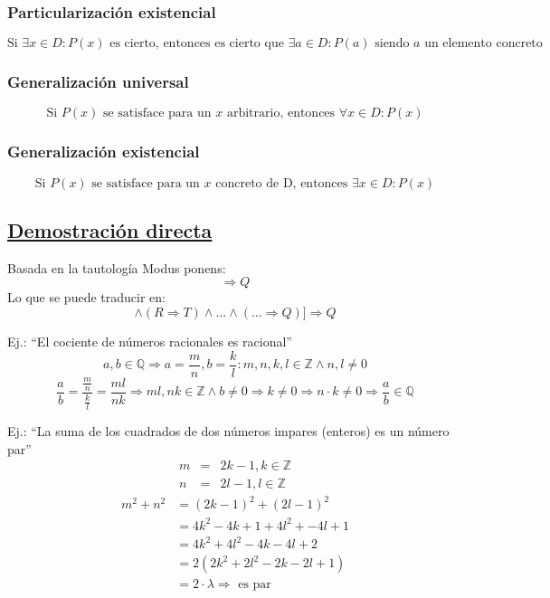 \documentclass[10pt,a4paper,openright]{book}
\begin{document}
\subsubsection*{Particularización existencial}
$$\mbox{Si }\exists x \in D : P(x)\mbox{ es cierto, entonces es cierto que }\exists a \in D : P(a)\mbox{ siendo } a \mbox{ un elemento concreto}$$
\subsubsection*{Generalización universal}
$$\mbox{Si }P(x)\mbox{ se satisface para un } x \mbox{ arbitrario, entonces } \forall x \in D : P(x)$$
\subsubsection*{Generalización existencial}
$$\mbox{Si }P(x)\mbox{ se satisface para un } x \mbox{ concreto de D, entonces } \exists x \in D : P(x)$$
\vspace{0.5cm}
\subsection*{\underline{Demostración directa}}
Basada en la tautología Modus ponens:
\begin{equation*}
[P\wedge (P\Rightarrow Q)]\Rightarrow Q
\end{equation*}
Lo que se puede traducir en:
\begin{equation*}
[P\wedge (P\Rightarrow R)]\wedge (R\Rightarrow T) \wedge ... \wedge (... \Rightarrow Q)]\Rightarrow Q
\end{equation*}

Ej.: “El cociente de números racionales es racional”
\begin{equation*}
a,b \in \mathbb Q \Rightarrow a=\frac{m}{n},b=\frac{k}{l}:m,n,k,l\in \mathbb Z \wedge n,l \neq 0
\end{equation*}
\begin{equation*}
\frac{a}{b}= \frac{\frac{m}{n}}{\frac{k}{l}}=\frac{ml}{nk}\Rightarrow ml,nk \in \mathbb Z \wedge b \neq 0 \Rightarrow k\neq 0 \Rightarrow n·k\neq 0 \Rightarrow \frac{a}{b} \in \mathbb Q
\end{equation*}

Ej.: “La suma de los cuadrados de dos números impares (enteros) es un número par”
\begin{eqnarray*}
m &=& 2k-1, k \in \mathbb Z \\
n &=& 2l-1, l \in \mathbb Z
\end{eqnarray*}
\begin{align*}
m^2+n^2 &=(2k-1)^2+(2l-1)^2 \\
		&=4k^2-4k+1+4l^2+-4l+1 \\
		&=4k^2+4l^2-4k-4l+2 \\
		&=2(2k^2+2l^2-2k-2l+1) \\
        &=2 \cdot \lambda \Rightarrow \mbox{ es par}
\end{align*}
\end{document}

